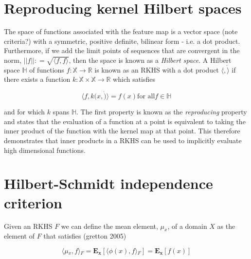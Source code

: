 \section{Reproducing kernel Hilbert spaces}

The space of functions associated with the feature map is a vector space (note criteria?) with a symmetric, positive definite, bilinear form - i.e. a dot product. Furthermore, if we add the limit points of sequences that are convergent in the norm, $||f|| \colon= \sqrt{\langle f, f \rangle}$, then the space is known as a \textit{Hilbert space}. A Hilbert space $\mathbb{H}$ of functions $f \colon \mathbb{X} \rightarrow \mathbb{R}$ is known as an RKHS with a dot product $\langle \dot, \dot \rangle$ if there exists a function $k \colon \mathbb{X} \times \mathbb{X} \rightarrow \mathbb{R}$ which satisfies

\begin{equation}
\langle f, k(x,\dot) \rangle = f(x) \text{for all} f \in \mathbb{H}
\end{equation}

\noindent and for which $k$ spans $\mathbb{H}$. \noindent The first property is known as the \textit{reproducing} property and states that the evaluation of a function at a point is equivalent to taking the inner product of the function with the kernel map at that point. This therefore demonstrates that inner products in a RKHS can be used to implicitly evaluate high dimensional functions. \\



\section{Hilbert-Schmidt independence criterion}


Given an RKHS $F$ we can define the mean element, $\mu_x$, of a domain $X$ as the element of $F$ that satisfies (gretton 2005)

\begin{equation}
\langle \mu{_x}, f \rangle{_F} = \mathbf{E_x}[\langle \phi(x), f \rangle{_F} ] = \mathbf{E_x}[f(x)]
\end{equation} 















